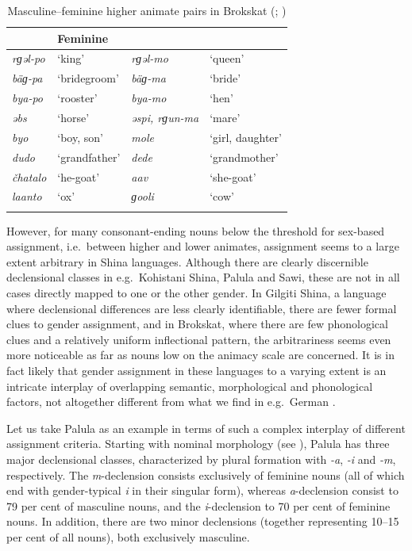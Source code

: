 \documentclass[output=collectionpaper]{langsci/langscibook}
\begin{document}
\begin{table}
\begin{tabularx}{0.9\textwidth}{XXXX}
\lsptoprule
\multicolumn{2}{X}{Masculine} & \multicolumn{2}{X}{Feminine}\\
\midrule
\itshape rɡəl-po & `king' & \itshape rɡəl-mo & `queen'\\
\itshape bäɡ-pa & `bridegroom' & \itshape bäɡ-ma & `bride'\\
\itshape bya-po & `rooster' & \itshape bya-mo & `hen'\\
\itshape əbs & `horse' & \itshape əspi, rɡun-ma & `mare'\\
\itshape byo & `boy, son' & \itshape mole & `girl, daughter'\\
\itshape dudo & `grandfather' & \itshape dede & `grandmother'\\
\itshape čhatalo & `he-goat' & \itshape aav & `she-goat'\\
\itshape laanto & `ox' & \itshape ɡooli & `cow'\\
\lspbottomrule
\end{tabularx}
\caption{Masculine--feminine higher animate pairs in Brokskat (\citealt[38--39]{Ramaswami1982}; \citealt[56--58, 80]{Sharma1998})}
\label{tab:Lilje:6}
\end{table}


However, for many consonant-ending nouns below the threshold for sex-based assignment, i.e.\ between higher and lower animates, assignment seems to a large extent arbitrary in Shina languages. Although there are clearly discernible declensional classes in e.g.\ Kohistani Shina, Palula and Sawi, these are not in all cases directly mapped to one or the other gender. In Gilgiti Shina, a language where declensional differences are less clearly identifiable, there are fewer formal clues to gender assignment, and in Brokskat, where there are few phonological clues and a relatively uniform inflectional pattern, the arbitrariness seems even more noticeable as far as nouns low on the animacy scale are concerned. It is in fact likely that gender assignment in these languages to a varying extent is an intricate interplay of overlapping semantic, morphological and phonological factors, not altogether different from what we find in e.g.\ German \citep[49]{Corbett1991}.

Let us take Palula as an example in terms of such a complex interplay of different assignment criteria. Starting with nominal morphology (see ), Palula has three major declensional classes, characterized by plural formation with \textit{\nobreakdash-a}, \textit{{}-i} and \textit{\nobreakdash-m}, respectively. The \textit{m}{}-declension consists exclusively of feminine nouns (all of which end with gender-typical \textit{i} in their singular form), whereas \textit{a}\hyp{}declension consist to 79 per cent of masculine nouns, and the \textit{i}{}-declension to 70 per cent of feminine nouns. In addition, there are two minor declensions (together representing 10--15 per cent of all nouns), both exclusively masculine.
\end{document}
